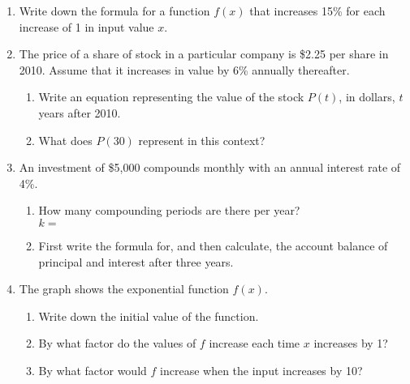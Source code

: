 \documentclass[12pt, twoside]{article}
\begin{document}
\begin{enumerate}
\item Write down the formula for a function $f(x)$ that increases 15\% for each increase of 1 in input value $x$. \vspace{2cm}
\item The price of a share of stock in a particular company is \$2.25 per share in 2010. Assume that it increases in value by 6\% annually thereafter. 
\begin{enumerate}
    \item 	Write an equation representing the value of the stock $P(t)$, in dollars, $t$ years after 2010. \vspace{2cm}
    \item What does $P(30)$ represent in this context? \vspace{2cm}
\end{enumerate}

\item An investment of \$5,000 compounds monthly with an annual interest rate of 4\%.
\begin{enumerate}[itemsep=0.5cm]
    \item How many compounding periods are there per year? \\[0.25cm]
    $k=$
    \item First write the formula for, and then calculate, the account balance of principal and interest after three years.
\end{enumerate} \vspace{2cm}

\newpage
\item The graph shows the exponential function $\displaystyle f(x)$.
\begin{multicols}{2}
    \begin{enumerate}[itemsep=1cm]
        \item Write down the initial value of the function.
        \item By what factor do the values of $f$ increase each time $x$ increases by 1?
        \item By what factor would $f$ increase when the input increases by 10?
    \end{enumerate}
    \begin{center}
    \end{center}
    \end{multicols}


\end{enumerate}
\end{document}
